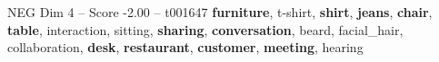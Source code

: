 \begin{textsample}{NEG Dim 4 – Score -2.00 – t001647}  \label{ex:f4_neg_032}
\textbf{furniture}, t-shirt, \textbf{shirt}, \textbf{jeans}, \textbf{chair}, \textbf{table}, interaction, sitting, \textbf{sharing}, \textbf{conversation}, beard, facial\_hair, collaboration, \textbf{desk}, \textbf{restaurant}, \textbf{customer}, \textbf{meeting}, hearing

\end{textsample}
